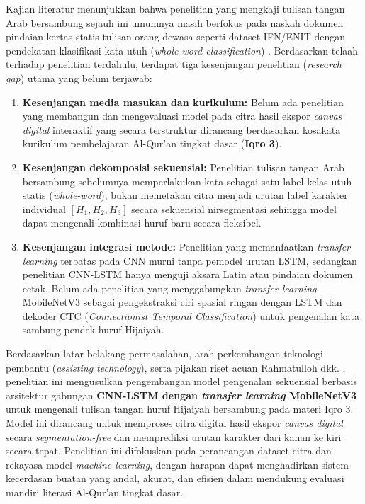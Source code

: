 \documentclass[conference]{IEEEtran}
\begin{document}
Kajian literatur menunjukkan bahwa penelitian yang mengkaji tulisan tangan Arab bersambung sejauh ini umumnya masih berfokus pada naskah dokumen pindaian kertas statis tulisan orang dewasa seperti dataset IFN/ENIT dengan pendekatan klasifikasi kata utuh (\textit{whole-word classification}) \cite{lamtougui2024, ahmed2021}. Berdasarkan telaah terhadap penelitian terdahulu, terdapat tiga kesenjangan penelitian (\textit{research gap}) utama yang belum terjawab:
\begin{enumerate}
    \item \textbf{Kesenjangan media masukan dan kurikulum:} Belum ada penelitian yang membangun dan mengevaluasi model pada citra hasil ekspor \textit{canvas digital} interaktif yang secara terstruktur dirancang berdasarkan kosakata kurikulum pembelajaran Al-Qur'an tingkat dasar (\textbf{Iqro 3}).
    \item \textbf{Kesenjangan dekomposisi sekuensial:} Penelitian tulisan tangan Arab bersambung sebelumnya \cite{lamtougui2024, ahmed2021} memperlakukan kata sebagai satu label kelas utuh statis (\textit{whole-word}), bukan memetakan citra menjadi urutan label karakter individual $[H_1, H_2, H_3]$ secara sekuensial nirsegmentasi sehingga model dapat mengenali kombinasi huruf baru secara fleksibel.
    \item \textbf{Kesenjangan integrasi metode:} Penelitian yang memanfaatkan \textit{transfer learning} \cite{masruroh2023, durayhim2023, lamtougui2024} terbatas pada CNN murni tanpa pemodel urutan LSTM, sedangkan penelitian CNN-LSTM \cite{saini2024, peng2024} hanya menguji aksara Latin atau pindaian dokumen cetak. Belum ada penelitian yang menggabungkan \textit{transfer learning} MobileNetV3 sebagai pengekstraksi ciri spasial ringan dengan LSTM dan dekoder CTC (\textit{Connectionist Temporal Classification}) untuk pengenalan kata sambung pendek huruf Hijaiyah.
\end{enumerate}

Berdasarkan latar belakang permasalahan, arah perkembangan teknologi pembantu (\textit{assisting technology}), serta pijakan riset acuan Rahmatulloh dkk. \cite{rahmatulloh2022}, penelitian ini mengusulkan pengembangan model pengenalan sekuensial berbasis arsitektur gabungan \textbf{CNN-LSTM dengan \textit{transfer learning} MobileNetV3} untuk mengenali tulisan tangan huruf Hijaiyah bersambung pada materi Iqro 3. Model ini dirancang untuk memproses citra digital hasil ekspor \textit{canvas digital} secara \textit{segmentation-free} dan memprediksi urutan karakter dari kanan ke kiri secara tepat. Penelitian ini difokuskan pada perancangan dataset citra dan rekayasa model \textit{machine learning}, dengan harapan dapat menghadirkan sistem kecerdasan buatan yang andal, akurat, dan efisien dalam mendukung evaluasi mandiri literasi Al-Qur'an tingkat dasar.
\end{document}
